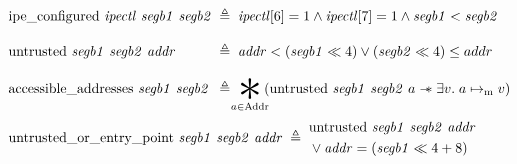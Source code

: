 \begin{figure}
  \centering
  \begin{align*}
    &\begin{alignedat}{2}
      &\pred{ipe\_configured}~\mathit{ipectl}~\mathit{segb1}~\mathit{segb2}
      \;&&\triangleq\; \mathit{ipectl}[6] = 1 \wedge \mathit{ipectl}[7] = 1 \wedge \mathit{segb1} < \mathit{segb2}
      \\[2ex]
      &\pred{untrusted}~\mathit{segb1}~\mathit{segb2}~\mathit{addr}
      &&\triangleq\; \mathit{addr} < (\mathit{segb1} \ll 4) \vee (\mathit{segb2} \ll 4) \leq addr
      \\[2ex]
      &\pred{accessible\_addresses}~\mathit{segb1}~\mathit{segb2}
      &&\triangleq\; \bigast_{\mathclap{a \in \pred{Addr}}}
         \left(\pred{untrusted}~\mathit{segb1}~\mathit{segb2}~a
         \wand \exists v.\; a \ptom v\right) %
    \end{alignedat} \\[2ex]
    &\pred{untrusted\_or\_entry\_point}~\mathit{segb1}~\mathit{segb2}~\mathit{addr} \;\triangleq\;
      \smash{\begin{aligned}
        &\pred{untrusted}~\mathit{segb1}~\mathit{segb2}~\mathit{addr} \\
        &\vee \mathit{addr} = (\mathit{segb1} \ll 4 + 8)
      \end{aligned}} \\[2.5ex]

\end{align*}
\end{figure}

